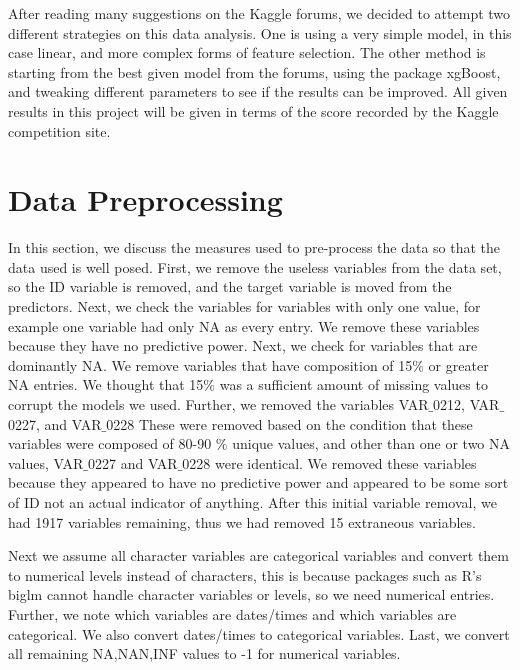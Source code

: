\documentclass[aps, reprint, groupedaddress, superscriptaddress, amsmath, 10pt]{revtex4-1}
\begin{document}
	After reading many suggestions on the Kaggle forums, we decided to attempt two different strategies on this data analysis.  One is using a very simple model, in this case linear, and more complex forms of feature selection.  The other method is starting from the best given model from the forums, using the package xgBoost, and tweaking different parameters to see if the results can be improved.  All given results in this project will be given in terms of the score recorded by the Kaggle competition site.
	
	\section{Data Preprocessing}
	In this section, we discuss the measures used to pre-process the data so that the data used is well posed.  First, we remove the useless variables from the data set, so the ID variable is removed, and the target variable is moved from the predictors.  Next, we check the variables for variables with only one value, for example one variable had only NA as every entry.  We remove these variables because they have no predictive power.  Next, we check for variables that are dominantly NA.  We remove variables that have composition of 15$\%$ or greater NA entries.  We thought that 15$\%$ was a sufficient amount of missing values to corrupt the models we used.  Further, we removed the variables VAR$\_$0212, VAR$\_$0227, and VAR$\_$0228 These were removed based on the condition that these variables were composed of 80-90 $\%$ unique values, and other than one or two NA values, VAR$\_$0227 and VAR$\_$0228 were identical.  We removed these variables because they appeared to have no predictive power and appeared to be some sort of ID not an actual indicator of anything.  After this initial variable removal, we had 1917 variables remaining, thus we had removed 15 extraneous variables.
	
	Next we assume all character variables are categorical variables and convert them to numerical levels instead of characters, this is because packages such as R's biglm cannot handle character variables or levels, so we need numerical entries.  Further, we note which variables are dates/times and which variables are categorical.  We also convert dates/times to categorical variables.  Last, we convert all remaining NA,NAN,INF values to -1 for numerical variables.  
	
	
\end{document}

